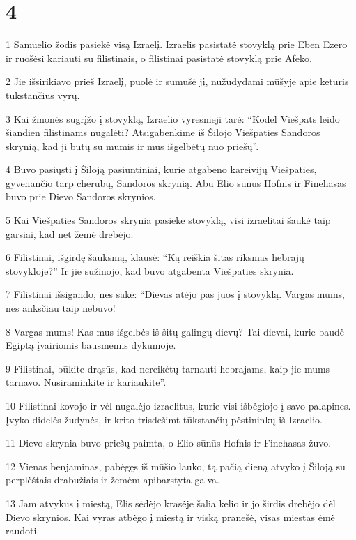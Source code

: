 \chapter{4}

\par 1 Samuelio žodis pasiekė visą Izraelį. Izraelis pasistatė stovyklą prie Eben Ezero ir ruošėsi kariauti su filistinais, o filistinai pasistatė stovyklą prie Afeko. 
\par 2 Jie išsirikiavo prieš Izraelį, puolė ir sumušė jį, nužudydami mūšyje apie keturis tūkstančius vyrų. 
\par 3 Kai žmonės sugrįžo į stovyklą, Izraelio vyresnieji tarė: “Kodėl Viešpats leido šiandien filistinams nugalėti? Atsigabenkime iš Šilojo Viešpaties Sandoros skrynią, kad ji būtų su mumis ir mus išgelbėtų nuo priešų”. 
\par 4 Buvo pasiųsti į Šiloją pasiuntiniai, kurie atgabeno kareivijų Viešpaties, gyvenančio tarp cherubų, Sandoros skrynią. Abu Elio sūnūs Hofnis ir Finehasas buvo prie Dievo Sandoros skrynios. 
\par 5 Kai Viešpaties Sandoros skrynia pasiekė stovyklą, visi izraelitai šaukė taip garsiai, kad net žemė drebėjo. 
\par 6 Filistinai, išgirdę šauksmą, klausė: “Ką reiškia šitas riksmas hebrajų stovykloje?” Ir jie sužinojo, kad buvo atgabenta Viešpaties skrynia. 
\par 7 Filistinai išsigando, nes sakė: “Dievas atėjo pas juos į stovyklą. Vargas mums, nes anksčiau taip nebuvo! 
\par 8 Vargas mums! Kas mus išgelbės iš šitų galingų dievų? Tai dievai, kurie baudė Egiptą įvairiomis bausmėmis dykumoje. 
\par 9 Filistinai, būkite drąsūs, kad nereikėtų tarnauti hebrajams, kaip jie mums tarnavo. Nusiraminkite ir kariaukite”. 
\par 10 Filistinai kovojo ir vėl nugalėjo izraelitus, kurie visi išbėgiojo į savo palapines. Įvyko didelės žudynės, ir krito trisdešimt tūkstančių pėstininkų iš Izraelio. 
\par 11 Dievo skrynia buvo priešų paimta, o Elio sūnūs Hofnis ir Finehasas žuvo. 
\par 12 Vienas benjaminas, pabėgęs iš mūšio lauko, tą pačią dieną atvyko į Šiloją su perplėštais drabužiais ir žemėm apibarstyta galva. 
\par 13 Jam atvykus į miestą, Elis sėdėjo krasėje šalia kelio ir jo širdis drebėjo dėl Dievo skrynios. Kai vyras atbėgo į miestą ir viską pranešė, visas miestas ėmė raudoti. 
